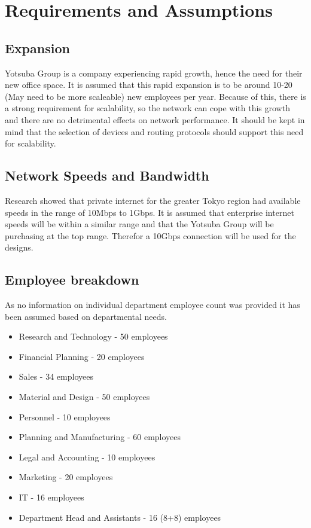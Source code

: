 \chapter{Requirements and Assumptions}

\section{Expansion}
Yotsuba Group is a company experiencing rapid growth, hence the need for their new office space. It is assumed that this rapid expansion is to be around 10-20 (May need to be more scaleable) new employees per year. Because of this, there is a strong requirement for scalability, so the network can cope with this growth and there are no detrimental effects on network performance. It should be kept in mind that the selection of devices and routing protocols should support this need for scalability.
\section{Network Speeds and Bandwidth}
Research showed that private internet for the greater Tokyo region had available speeds in the range of 10Mbps to 1Gbps. It is assumed that enterprise internet speeds will be within a similar range and that the Yotsuba Group will be purchasing at the top range. Therefor a 10Gbps connection will be used for the designs.
\section{Employee breakdown}
As no information on individual department employee count was provided it has been assumed based on departmental needs.
\begin{itemize}
    \item Research and Technology - 50 employees
    \item Financial Planning - 20 employees
    \item Sales - 34 employees
    \item Material and Design - 50 employees
    \item Personnel - 10 employees
    \item Planning and Manufacturing - 60 employees
    \item Legal and Accounting - 10 employees
    \item Marketing - 20 employees
    \item IT - 16 employees
    \item Department Head and Assistants - 16 (8+8) employees
\end{itemize}
